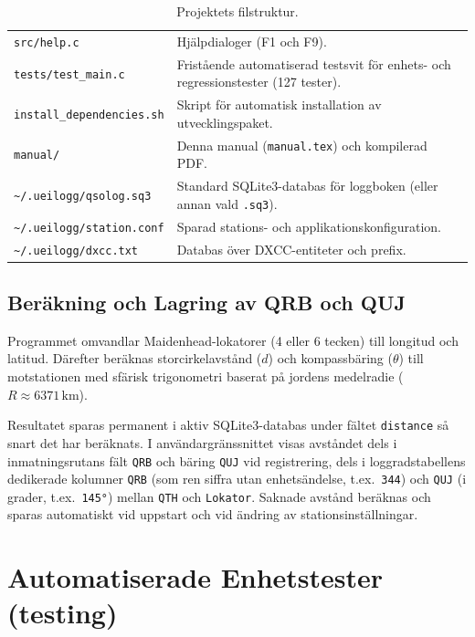 \documentclass[11pt,a4paper]{article}
\begin{document}
\begin{table}[htbp]
\begin{tabularx}{\textwidth}{lX}
\texttt{src/help.c} & Hjälpdialoger (F1 och F9). \\
\texttt{tests/test\_main.c} & Fristående automatiserad testsvit för enhets- och regressionstester (127 tester). \\
\texttt{install\_dependencies.sh} & Skript för automatisk installation av utvecklingspaket. \\
\texttt{manual/} & Denna manual (\texttt{manual.tex}) och kompilerad PDF. \\
\texttt{\textasciitilde/.ueilogg/qsolog.sq3} & Standard SQLite3-databas för loggboken (eller annan vald \texttt{.sq3}). \\
\texttt{\textasciitilde/.ueilogg/station.conf} & Sparad stations- och applikationskonfiguration. \\
\texttt{\textasciitilde/.ueilogg/dxcc.txt} & Databas över DXCC-entiteter och prefix. \\
\bottomrule
\end{tabularx}
\caption{Projektets filstruktur.}
\end{table}

\subsection{Beräkning och Lagring av QRB och QUJ}
Programmet omvandlar Maidenhead-lokatorer (4 eller 6 tecken) till longitud och latitud. Därefter beräknas storcirkelavstånd ($d$) och kompassbäring ($\theta$) till motstationen med sfärisk trigonometri baserat på jordens medelradie ($R \approx 6371\,\text{km}$).

Resultatet sparas permanent i aktiv SQLite3-databas under fältet \texttt{distance} så snart det har beräknats. I användargränssnittet visas avståndet dels i inmatningsrutans fält \texttt{QRB} och bäring \texttt{QUJ} vid registrering, dels i loggradstabellens dedikerade kolumner \texttt{QRB} (som ren siffra utan enhetsändelse, t.ex.\ \texttt{344}) och \texttt{QUJ} (i grader, t.ex.\ \texttt{145°}) mellan \texttt{QTH} och \texttt{Lokator}. Saknade avstånd beräknas och sparas automatiskt vid uppstart och vid ändring av stationsinställningar.

\section{Automatiserade Enhetstester (testing)}
\label{sec:testing}
\end{document}
